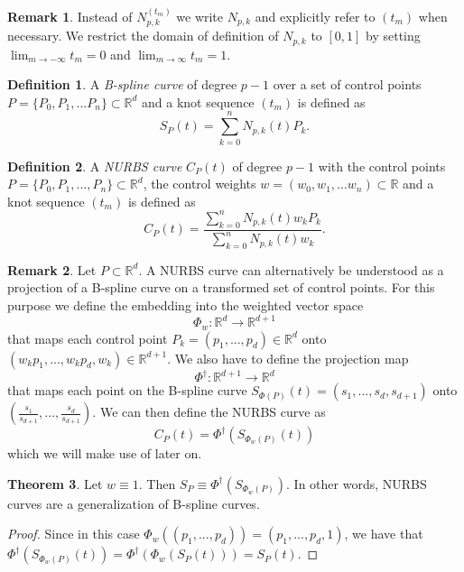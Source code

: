\documentclass[a4paper, 11pt]{report}
\theoremstyle{definition}
\newtheorem{definition}{Definition}[section]
\newtheorem{theorem}[definition]{Theorem}
\newtheorem*{remark}{Remark}
\renewcommand{\emph}[1]{\textit{#1}}
\begin{document}
\begin{remark}
	Instead of $N_{p,k}^{(t_m)}$ we write $N_{p,k}$ and explicitly refer to $(t_m)$ when necessary. We restrict the domain of definition of $N_{p,k}$ to $[0, 1]$ by setting $\lim_{m \to -\infty} t_m = 0$ and $\lim_{m \to \infty} t_m = 1$.
\end{remark}

\begin{definition}
	A \emph{B-spline curve} of degree $p-1$ over a set of control points $P = \{P_0, P_1, ... P_n\} \subset \mathbb{R}^d$ and a knot sequence $(t_m)$ is defined as $$ S_P(t) = \sum_{k=0}^{n} N_{p,k}(t) P_k.$$
\end{definition}

\begin{definition}\label{def:nurbs}
	A \emph{NURBS curve} $C_P(t)$ of degree $p-1$ with the control points $P = \{P_0, P_1, ..., P_n\} \subset \mathbb{R}^d$, the control weights $w = (w_0, w_1, ... w_n) \subset \mathbb{R}$ and a knot sequence $(t_m)$ is defined as
	\begin{equation}
		C_P(t) = \frac{\sum_{k=0}^n N_{p,k}(t) w_k P_k}{\sum_{k=0}^n N_{p,k}(t) w_k}.
	\end{equation}
\end{definition}

\begin{remark}
	Let $P \subset \mathbb{R}^d$. A NURBS curve can alternatively be understood as a projection of a B-spline curve on a transformed set of control points. For this purpose we define the embedding into the weighted vector space
		$$\Phi_w: \mathbb{R}^d \rightarrow \mathbb{R}^{d+1}$$
	that maps each control point $P_k = (p_1, ..., p_d) \in \mathbb{R}^d$ onto $(w_k p_1, ..., w_k p_d, w_k) \in \mathbb{R}^{d+1}$.
	We also have to define the projection map
		$$\Phi^\dagger: \mathbb{R}^{d+1} \rightarrow \mathbb{R}^d$$ 
	that maps each point on the B-spline curve $S_{\Phi(P)}(t) = (s_1, ..., s_d, s_{d+1})$ onto $(\frac{s_1}{s_{d+1}}, ..., \frac{s_d}{s_{d+1}})$.
	We can then define the NURBS curve as
			$$ C_P(t) = \Phi^\dagger(S_{\Phi_w(P)}(t))$$ 
	which we will make use of later on.
\end{remark}

\begin{theorem}
	Let $w \equiv 1$. Then $S_P \equiv \Phi^\dagger(S_{\Phi_w(P)})$. In other words, NURBS curves are a generalization of B-spline curves.
\end{theorem}
\begin{proof}
	Since in this case $\Phi_w((p_1, ..., p_d)) = (p_1, ..., p_d, 1)$, we have that $\Phi^\dagger(S_{\Phi_w(P)}(t)) = \Phi^\dagger(\Phi_w(S_P(t))) = S_P(t)$.
\end{proof}
\end{document}

